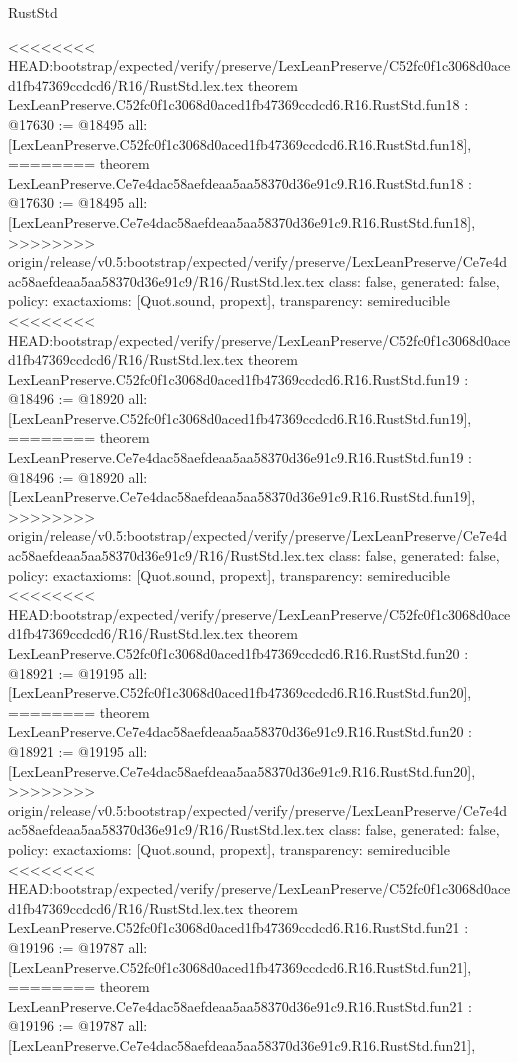 \begin{lexlean}{RustStd}
\begin{coremodule}
{\begin{coremodule}
{{{{{{{{{{{{{{{{{{{{{}
<<<<<<<< HEAD:bootstrap/expected/verify/preserve/LexLeanPreserve/C52fc0f1c3068d0aced1fb47369ccdcd6/R16/RustStd.lex.tex
theorem LexLeanPreserve.C52fc0f1c3068d0aced1fb47369ccdcd6.R16.RustStd.fun18 : @17630 := @18495 {
  all: [LexLeanPreserve.C52fc0f1c3068d0aced1fb47369ccdcd6.R16.RustStd.fun18],
========
theorem LexLeanPreserve.Ce7e4dac58aefdeaa5aa58370d36e91c9.R16.RustStd.fun18 : @17630 := @18495 {
  all: [LexLeanPreserve.Ce7e4dac58aefdeaa5aa58370d36e91c9.R16.RustStd.fun18],
>>>>>>>> origin/release/v0.5:bootstrap/expected/verify/preserve/LexLeanPreserve/Ce7e4dac58aefdeaa5aa58370d36e91c9/R16/RustStd.lex.tex
  class: false,
  generated: false,
  policy: exact{axioms: [Quot.sound, propext]},
  transparency: semireducible
}
<<<<<<<< HEAD:bootstrap/expected/verify/preserve/LexLeanPreserve/C52fc0f1c3068d0aced1fb47369ccdcd6/R16/RustStd.lex.tex
theorem LexLeanPreserve.C52fc0f1c3068d0aced1fb47369ccdcd6.R16.RustStd.fun19 : @18496 := @18920 {
  all: [LexLeanPreserve.C52fc0f1c3068d0aced1fb47369ccdcd6.R16.RustStd.fun19],
========
theorem LexLeanPreserve.Ce7e4dac58aefdeaa5aa58370d36e91c9.R16.RustStd.fun19 : @18496 := @18920 {
  all: [LexLeanPreserve.Ce7e4dac58aefdeaa5aa58370d36e91c9.R16.RustStd.fun19],
>>>>>>>> origin/release/v0.5:bootstrap/expected/verify/preserve/LexLeanPreserve/Ce7e4dac58aefdeaa5aa58370d36e91c9/R16/RustStd.lex.tex
  class: false,
  generated: false,
  policy: exact{axioms: [Quot.sound, propext]},
  transparency: semireducible
}
<<<<<<<< HEAD:bootstrap/expected/verify/preserve/LexLeanPreserve/C52fc0f1c3068d0aced1fb47369ccdcd6/R16/RustStd.lex.tex
theorem LexLeanPreserve.C52fc0f1c3068d0aced1fb47369ccdcd6.R16.RustStd.fun20 : @18921 := @19195 {
  all: [LexLeanPreserve.C52fc0f1c3068d0aced1fb47369ccdcd6.R16.RustStd.fun20],
========
theorem LexLeanPreserve.Ce7e4dac58aefdeaa5aa58370d36e91c9.R16.RustStd.fun20 : @18921 := @19195 {
  all: [LexLeanPreserve.Ce7e4dac58aefdeaa5aa58370d36e91c9.R16.RustStd.fun20],
>>>>>>>> origin/release/v0.5:bootstrap/expected/verify/preserve/LexLeanPreserve/Ce7e4dac58aefdeaa5aa58370d36e91c9/R16/RustStd.lex.tex
  class: false,
  generated: false,
  policy: exact{axioms: [Quot.sound, propext]},
  transparency: semireducible
}
<<<<<<<< HEAD:bootstrap/expected/verify/preserve/LexLeanPreserve/C52fc0f1c3068d0aced1fb47369ccdcd6/R16/RustStd.lex.tex
theorem LexLeanPreserve.C52fc0f1c3068d0aced1fb47369ccdcd6.R16.RustStd.fun21 : @19196 := @19787 {
  all: [LexLeanPreserve.C52fc0f1c3068d0aced1fb47369ccdcd6.R16.RustStd.fun21],
========
theorem LexLeanPreserve.Ce7e4dac58aefdeaa5aa58370d36e91c9.R16.RustStd.fun21 : @19196 := @19787 {
  all: [LexLeanPreserve.Ce7e4dac58aefdeaa5aa58370d36e91c9.R16.RustStd.fun21],
}}}}}}}}}}}}}}}}}}}}}}}}}
\end{coremodule}}
\end{coremodule}
\end{lexlean}
